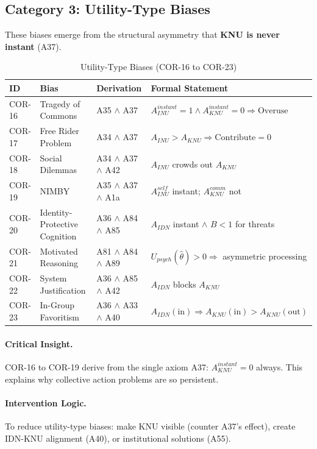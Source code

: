 \subsection{Category 3: Utility-Type Biases}

These biases emerge from the structural asymmetry that \textbf{KNU is never instant} (A37).

\begin{table}[htbp]
\small
\centering
\caption{Utility-Type Biases (COR-16 to COR-23)}
\label{tab:cor-utility}
\begin{tabular}{p{1.2cm}p{2.8cm}p{3.8cm}p{5cm}}
\toprule
\textbf{ID} & \textbf{Bias} & \textbf{Derivation} & \textbf{Formal Statement} \\
\midrule
COR-16 & Tragedy of Commons & A35 $\land$ A37 & $A_{INU}^{instant} = 1 \land A_{KNU}^{instant} = 0 \Rightarrow \text{Overuse}$ \\
COR-17 & Free Rider Problem & A34 $\land$ A37 & $A_{INU} > A_{KNU} \Rightarrow \text{Contribute} = 0$ \\
COR-18 & Social Dilemmas & A34 $\land$ A37 $\land$ A42 & $A_{INU}$ crowds out $A_{KNU}$ \\
COR-19 & NIMBY & A35 $\land$ A37 $\land$ A1a & $A^{self}_{INU}$ instant; $A^{comm}_{KNU}$ not \\
COR-20 & Identity-Protective Cognition & A36 $\land$ A84 $\land$ A85 & $A_{IDN}$ instant $\land$ $B < 1$ for threats \\
COR-21 & Motivated Reasoning & A81 $\land$ A84 $\land$ A89 & $U_{psych}(\hat{\theta}) > 0 \Rightarrow$ asymmetric processing \\
COR-22 & System Justification & A36 $\land$ A85 $\land$ A42 & $A_{IDN}$ blocks $A_{KNU}$ \\
COR-23 & In-Group Favoritism & A36 $\land$ A33 $\land$ A40 & $A_{IDN}(\text{in}) \Rightarrow A_{KNU}(\text{in}) > A_{KNU}(\text{out})$ \\
\bottomrule
\end{tabular}
\end{table}

\paragraph{Critical Insight.} COR-16 to COR-19 derive from the single axiom A37: $A_{KNU}^{instant} = 0$ always. This explains why collective action problems are so persistent.

\paragraph{Intervention Logic.} To reduce utility-type biases: make KNU visible (counter A37's effect), create IDN-KNU alignment (A40), or institutional solutions (A55).

